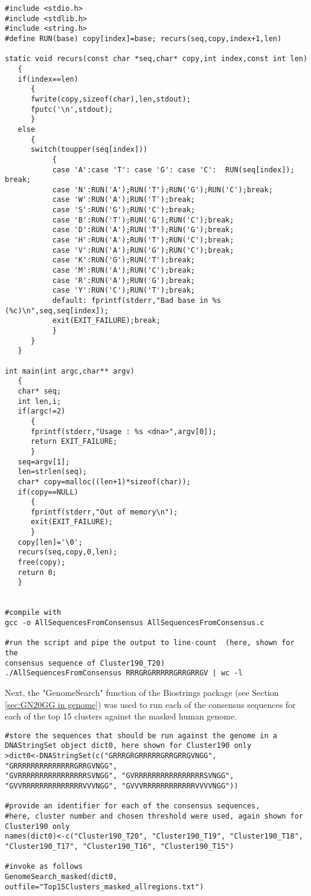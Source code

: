 \begin{lstlisting}
#include <stdio.h>
#include <stdlib.h>
#include <string.h>
#define RUN(base) copy[index]=base; recurs(seq,copy,index+1,len)

static void recurs(const char *seq,char* copy,int index,const int len)
   {
   if(index==len)
      {
      fwrite(copy,sizeof(char),len,stdout);
      fputc('\n',stdout);
      }
   else
      {
      switch(toupper(seq[index]))
           {
           case 'A':case 'T': case 'G': case 'C':  RUN(seq[index]); break;
           case 'N':RUN('A');RUN('T');RUN('G');RUN('C');break;
           case 'W':RUN('A');RUN('T');break;
           case 'S':RUN('G');RUN('C');break;
           case 'B':RUN('T');RUN('G');RUN('C');break;
           case 'D':RUN('A');RUN('T');RUN('G');break;
           case 'H':RUN('A');RUN('T');RUN('C');break;
           case 'V':RUN('A');RUN('G');RUN('C');break;
           case 'K':RUN('G');RUN('T');break;
           case 'M':RUN('A');RUN('C');break;
           case 'R':RUN('A');RUN('G');break;
           case 'Y':RUN('C');RUN('T');break;
           default: fprintf(stderr,"Bad base in %s (%c)\n",seq,seq[index]);
           exit(EXIT_FAILURE);break;
           }
      }
   }

int main(int argc,char** argv)
   {
   char* seq;
   int len,i;
   if(argc!=2)
      {
      fprintf(stderr,"Usage : %s <dna>",argv[0]);
      return EXIT_FAILURE;
      }
   seq=argv[1];
   len=strlen(seq);
   char* copy=malloc((len+1)*sizeof(char));
   if(copy==NULL)
      {
      fprintf(stderr,"Out of memory\n");
      exit(EXIT_FAILURE);
      }
   copy[len]='\0';
   recurs(seq,copy,0,len);
   free(copy);
   return 0;
   }


#compile with
gcc -o AllSequencesFromConsensus AllSequencesFromConsensus.c

#run the script and pipe the output to line-count  (here, shown for the 
consensus sequence of Cluster190_T20)
./AllSequencesFromConsensus RRRGRGRRRRRGRRGRRGV | wc -l
\end{lstlisting}

Next, the "GenomeSearch" function of the Biostrings package (see Section \ref{sec:GN20GG in genome}) was used to run each of the consensus sequences for each of the top 15 clusters against the masked human genome. 

\begin{lstlisting}
#store the sequences that should be run against the genome in a
DNAStringSet object dict0, here shown for Cluster190 only
>dict0<-DNAStringSet(c("GRRRGRGRRRRRGRRGRRGVNGG", "GRRRRRRRRRRRRRRGRRGVNGG",
"GVRRRRRRRRRRRRRRRRSVNGG", "GVRRRRRRRRRRRRRRRRSVNGG",
"GVVRRRRRRRRRRRRRRVVVNGG", "GVVVRRRRRRRRRRRRVVVVNGG"))

#provide an identifier for each of the consensus sequences,
#here, cluster number and chosen threshold were used, again shown for Cluster190 only
names(dict0)<-c("Cluster190_T20", "Cluster190_T19", "Cluster190_T18", "Cluster190_T17", "Cluster190_T16", "Cluster190_T15")

#invoke as follows
GenomeSearch_masked(dict0, outfile="Top15Clusters_masked_allregions.txt")
\end{lstlisting}

